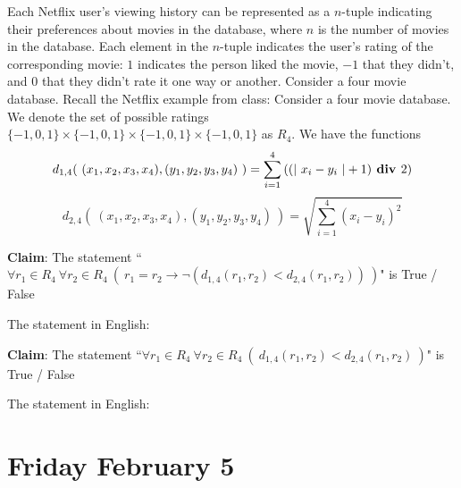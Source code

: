 \documentclass[12pt, oneside]{article}
\begin{document}
\newpage
Each Netflix user's viewing history can be represented as a $n$-tuple indicating their preferences about
movies in the database, where $n$ is the number of movies in the database.  Each element in the $n$-tuple indicates
the user's rating of the corresponding movie: $1$ indicates the person liked the movie, $-1$ that they didn't, and $0$ that 
they didn't rate it one way or another. Consider a four movie database. Recall the Netflix example from class: Consider a four movie database. We denote the set of possible ratings 
$\{-1,0,1\} \times \{-1,0,1\} \times \{-1,0,1\} \times \{-1,0,1\}$ as $R_4$. We have the functions
\[
d_{1,4}(~ (x_1, x_2, x_3, x_4) , (y_1, y_2, y_3, y_4) ~) =  \sum_{i=1}^4\left( (\lvert~x_i-y_i~\rvert + 1) \textbf{ div } 2 \right)
\]
\[
d_{2,4}(~ (x_1, x_2, x_3, x_4) , (y_1, y_2, y_3, y_4) ~) =  \sqrt{ \sum_{i=1}^4 (x_i - y_i)^2}
\]


{\bf Claim}: The statement ``$\forall r_1 \in R_4 ~\forall r_2 \in R_4 ~(~r_1 = r_2 \to \neg \left( d_{1,4}(r_1,r_2) < d_{2,4} (r_1,r_2) \right)~)$" is True / False 


The statement in English: \underline{\hspace{5.5in}}

\phantom{When two ratings are equal then it's not the case that their $d_1$ distance
is less than their $d_2$ distance.}

\vfill



{\bf Claim}: The statement ``$\forall r_1 \in R_4 ~\forall r_2 \in R_4 ~(~d_{1,4}(r_1,r_2) < d_{2,4} (r_1,r_2)  ~)$" 
is True / False 

The statement in English: \underline{\hspace{5.5in}}

\phantom{When two ratings are equal then it's not the case that their $d_1$ distance
is less than their $d_2$ distance.}

\vfill

\section*{Friday February 5}
\end{document}
